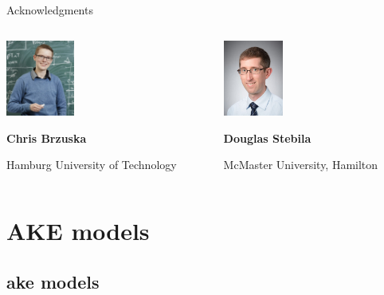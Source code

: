\documentclass[xcolor={dvipsnames},screen, aspectratio=43,compress]{beamer}
\begin{document}
\begin{frame}{Acknowledgments}
	\begin{columns}[t]
		\begin{column}{0.49\textwidth}
			\centering
			\includegraphics[height=2.5cm,keepaspectratio]{chris}
			
			\medskip
			\scriptsize
			\textbf{Chris Brzuska}
			
			Hamburg University of Technology

		\end{column}
		\begin{column}{0.49\textwidth}
			\centering
			\includegraphics[height=2.5cm,keepaspectratio]{douglas}
			
			\medskip
			\scriptsize
			\textbf{Douglas Stebila}
			
			McMaster University, Hamilton

		\end{column}
	\end{columns}
\end{frame}





\section{AKE models}
\subsection{ake models}
\end{document}
